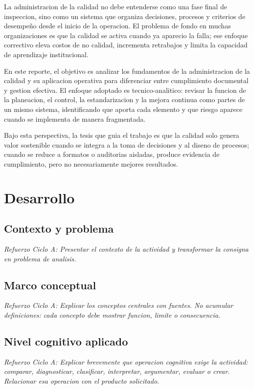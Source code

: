 \documentclass[
	spanish,
	letterpaper, oneside
]{article}
\begin{document}
La administracion de la calidad no debe entenderse como una fase final de inspeccion, sino como un sistema que organiza decisiones, procesos y criterios de desempeño desde el inicio de la operacion. El problema de fondo en muchas organizaciones es que la calidad se activa cuando ya aparecio la falla; ese enfoque correctivo eleva costos de no calidad, incrementa retrabajos y limita la capacidad de aprendizaje institucional.

En este reporte, el objetivo es analizar los fundamentos de la administracion de la calidad y su aplicacion operativa para diferenciar entre cumplimiento documental y gestion efectiva. El enfoque adoptado es tecnico-analitico: revisar la funcion de la planeacion, el control, la estandarizacion y la mejora continua como partes de un mismo sistema, identificando que aporta cada elemento y que riesgo aparece cuando se implementa de manera fragmentada.

Bajo esta perspectiva, la tesis que guia el trabajo es que la calidad solo genera valor sostenible cuando se integra a la toma de decisiones y al diseno de procesos; cuando se reduce a formatos o auditorias aisladas, produce evidencia de cumplimiento, pero no necesariamente mejores resultados.

\section{Desarrollo}

\subsection{Contexto y problema}

\textit{Refuerzo Ciclo A: Presentar el contexto de la actividad y transformar la consigna en problema de analisis.}

\subsection{Marco conceptual}

\textit{Refuerzo Ciclo A: Explicar los conceptos centrales con fuentes. No acumular definiciones: cada concepto debe mostrar funcion, limite o consecuencia.}

\subsection{Nivel cognitivo aplicado}

\textit{Refuerzo Ciclo A: Explicar brevemente que operacion cognitiva exige la actividad: comparar, diagnosticar, clasificar, interpretar, argumentar, evaluar o crear. Relacionar esa operacion con el producto solicitado.}
\end{document}
